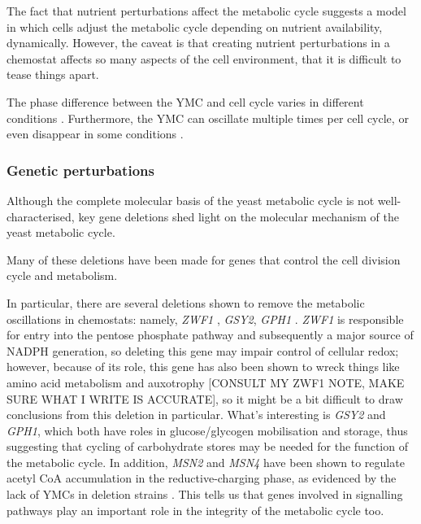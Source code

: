 The fact that nutrient perturbations affect the metabolic cycle suggests a model in which cells adjust the metabolic cycle depending on nutrient availability, dynamically. %
However, the caveat is that creating nutrient perturbations in a chemostat affects so many aspects of the cell environment, that it is difficult to tease things apart.

The phase difference between the YMC and cell cycle varies in different conditions %
\citep{ewaldYeastCyclinDependentKinase2016}. %
Furthermore, the YMC can oscillate multiple times per cell cycle, or even disappear in some conditions \citep{baumgartnerFlavinbasedMetabolicCycles2018}. %

\subsubsection{Genetic perturbations}
\label{subsubsec:intro-ymc-perturbations-genetic}
Although the complete molecular basis of the yeast metabolic cycle is not well-characterised, key gene deletions shed light on the molecular mechanism of the yeast metabolic cycle.

Many of these deletions have been made for genes that control the cell division cycle and metabolism.

In particular, there are several deletions shown to remove the metabolic oscillations in chemostats: namely, \emph{ZWF1} \citep{tuCyclicChangesMetabolic2007}, \emph{GSY2}, \emph{GPH1} \parencite{oneillCircadianRhythmsPersist2011}.
\emph{ZWF1} is responsible for entry into the pentose phosphate pathway and subsequently a major source of NADPH generation, so deleting this gene may impair control of cellular redox;
however, because of its role, this gene has also been shown to wreck things like amino acid metabolism and auxotrophy [CONSULT MY ZWF1 NOTE, MAKE SURE WHAT I WRITE IS ACCURATE], so it might be a bit difficult to draw conclusions from this deletion in particular.
What's interesting is \emph{GSY2} and \emph{GPH1}, which both have roles in glucose/glycogen mobilisation and storage, thus suggesting that cycling of carbohydrate stores may be needed for the function of the metabolic cycle. %
In addition, \emph{MSN2} and \emph{MSN4} have been shown to regulate acetyl CoA accumulation in the reductive-charging phase, as evidenced by the lack of YMCs in deletion strains \citep{kuangMsn2RegulateExpression2017}.
This tells us that genes involved in signalling pathways play an important role in the integrity of the metabolic cycle too.

